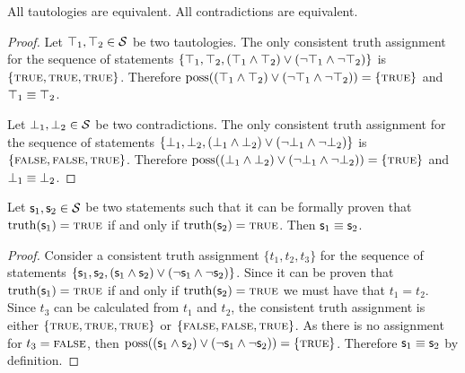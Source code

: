 \documentclass[11pt,letterpaper,fleqn]{memoir} %
\begin{document}
\begin{mathSection}

\begin{prop}
	All tautologies are equivalent. All contradictions are equivalent.
\end{prop}
\begin{proof}
	Let $\top_1, \top_2 \in \mathcal{S}$ be two tautologies. The only consistent truth assignment for the sequence of statements $\{\top_1, \top_2, (\top_1 \wedge \top_2) \vee (\neg\top_1 \wedge \neg\top_2)\}$ is $\{\textsc{true}, \textsc{true}, \textsc{true} \}$. Therefore $\operatorname{poss}((\top_1 \wedge \top_2) \vee (\neg\top_1 \wedge \neg\top_2)) = \{\textsc{true}\}$ and $\top_1 \equiv \top_2$.
	
	Let $\bot_1, \bot_2 \in \mathcal{S}$ be two contradictions. The only consistent truth assignment for the sequence of statements $\{\bot_1, \bot_2, (\bot_1 \wedge \bot_2) \vee (\neg\bot_1 \wedge \neg\bot_2)\}$ is $\{\textsc{false}, \textsc{false}, \textsc{true} \}$. Therefore $\operatorname{poss}((\bot_1 \wedge \bot_2) \vee (\neg\bot_1 \wedge \neg\bot_2)) = \{\textsc{true}\}$ and $\bot_1 \equiv \bot_2$.
\end{proof}

\begin{prop}\label{prop_equivalent_is_iff}
	Let $\mathsf{s}_1, \mathsf{s}_2 \in \mathcal{S}$ be two statements such that it can be formally proven that $\operatorname{truth}(\mathsf{s}_1) = \textsc{true}$ if and only if $\operatorname{truth}(\mathsf{s}_2) = \textsc{true}$. Then $\mathsf{s}_1 \equiv \mathsf{s}_2$.
\end{prop}

\begin{proof}
	Consider a consistent truth assignment $\{t_1, t_2, t_3\}$ for the sequence of statements $\{\mathsf{s}_1, \mathsf{s}_2, (\mathsf{s}_1 \wedge \mathsf{s}_2) \vee (\neg\mathsf{s}_1 \wedge \neg\mathsf{s}_2)\}$. Since it can be proven that $\operatorname{truth}(\mathsf{s}_1) = \textsc{true}$ if and only if $\operatorname{truth}(\mathsf{s}_2) = \textsc{true}$ we must have that $t_1=t_2$. Since $t_3$ can be calculated from $t_1$ and $t_2$, the consistent truth assignment is either $\{\textsc{true}, \textsc{true}, \textsc{true}\}$ or $\{\textsc{false}, \textsc{false}, \textsc{true}\}$. As there is no assignment for $t_3=\textsc{false}$, then $\operatorname{poss}((\mathsf{s}_1 \wedge \mathsf{s}_2) \vee (\neg\mathsf{s}_1 \wedge \neg\mathsf{s}_2)) = \{\textsc{true}\}$. Therefore $\mathsf{s}_1 \equiv \mathsf{s}_2$ by definition.
\end{proof}


\end{mathSection}
\end{document}
